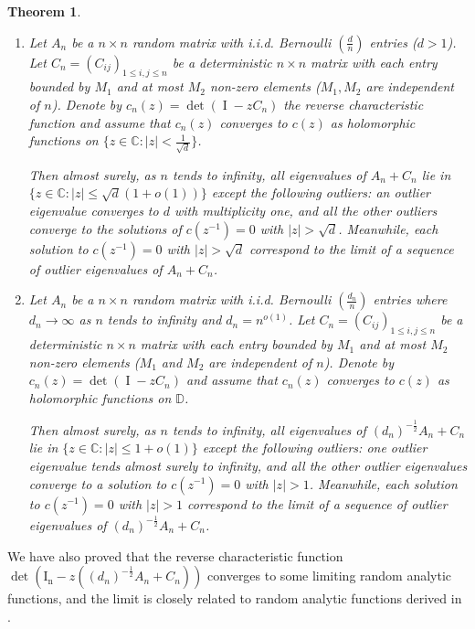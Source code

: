 \documentclass[12pt, reqno]{amsart}
\newtheorem{theorem}{Theorem}[section]
\theoremstyle{definition}
\theoremstyle{remark}
\numberwithin{equation}{section}
\begin{document}
\begin{theorem}\label{theorem1.2}
\begin{enumerate}
\item Let $A_n$ be a $n\times n$ random matrix with i.i.d. Bernoulli $(\frac{d}{n})$ entries ($d>1$). Let $C_n=(C_{ij})_{1\leq i,j\leq n}$ be a deterministic $n\times n$ matrix with each entry bounded by $M_1$ and at most $M_2$ non-zero elements ($M_1,M_2$ are independent of $n$). Denote by $c_n(z)=\det(\operatorname{I}-zC_n)$ the reverse characteristic function and assume that $c_n(z)$ converges to $c(z)$ as holomorphic functions on $\{z\in\mathbb{C}:|z|<\frac{1}{\sqrt{d}}\}$. 

Then almost surely, as $n$ tends to infinity, all eigenvalues of $A_n+C_n$ lie in $\{z\in\mathbb{C}:|z|\leq \sqrt{d}(1+o(1))\}$ except the following outliers: an outlier eigenvalue converges to $d$ with multiplicity one, and all the other outliers converge to the solutions of $c(z^{-1})=0$ with $|z|>\sqrt{d}$. Meanwhile, each solution to $c(z^{-1})=0$ with $|z|>\sqrt{d}$ correspond to the limit of a sequence of outlier eigenvalues of $A_n+C_n$.

\item Let $A_n$ be a $n\times n$ random matrix with i.i.d. Bernoulli $(\frac{d_n}{n})$ entries where $d_n\to\infty$ as $n$ tends to infinity and $d_n=n^{o(1)}$. Let $C_n=(C_{ij})_{1\leq i,j\leq n}$ be a deterministic $n\times n$ matrix with each entry bounded by $M_1$ and at most $M_2$ non-zero elements ($M_1$ and $M_2$ are independent of $n$). Denote by $c_n(z)=\det(\operatorname{I}-zC_n)$ and assume that $c_n(z)$ converges to $c(z)$ as holomorphic functions on $\mathbb{D}$. 

Then almost surely, as $n$ tends to infinity, all eigenvalues of $(d_n)^{-\frac{1}{2}}A_n+C_n$ lie in $\{z\in\mathbb{C}:|z|\leq 1+o(1)\}$ except the following outliers: one outlier eigenvalue tends almost surely to infinity, and all the other outlier eigenvalues converge to a solution to $c(z^{-1})=0$ with $|z|>1$. Meanwhile, each solution to $c(z^{-1})=0$ with $|z|>1$ correspond to the limit of a sequence of outlier eigenvalues of $(d_n)^{-\frac{1}{2}}A_n+C_n$.
\end{enumerate}

\end{theorem}

We have also proved that the reverse characteristic function $\det(\operatorname{I_n}-z((d_n)^{-\frac{1}{2}}A_n+C_n))$ converges to some limiting random analytic functions, and the limit is closely related to random analytic functions derived in \cite{coste2023sparse}.
\end{document}
